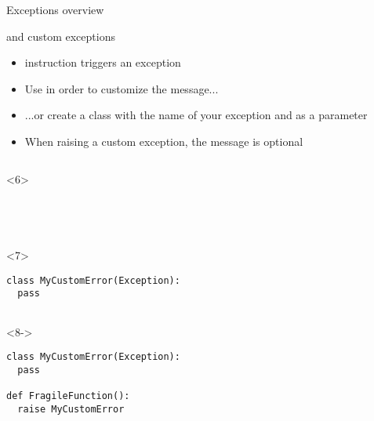 \begin{frame}[fragile]{Exceptions overview}

   and custom exceptions

  \begin{itemize}
    \item<2->  instruction triggers an exception
    \item<3-> Use  in order to customize the message...
    \item<4-> ...or create a class with the name of your exception and  as a parameter
    \item<5-> When raising a custom exception, the message is optional
  \end{itemize}

  \begin{columns}[onlytextwidth]
    \begin{column}{\textwidth}

      \begin{onlyenv}<6>
        \begin{lstlisting}[style=python,morekeywords={as}]




 \end{lstlisting}
      \end{onlyenv}

      \begin{onlyenv}<7>
        \begin{lstlisting}[style=python,morekeywords={as}]
class MyCustomError(Exception):
  pass


 \end{lstlisting}
      \end{onlyenv}

      \begin{onlyenv}<8->
        \begin{lstlisting}[style=python,morekeywords={as}]
class MyCustomError(Exception):
  pass

def FragileFunction():
  raise MyCustomError \end{lstlisting}
      \end{onlyenv}

    \end{column}
  \end{columns}

\end{frame}



